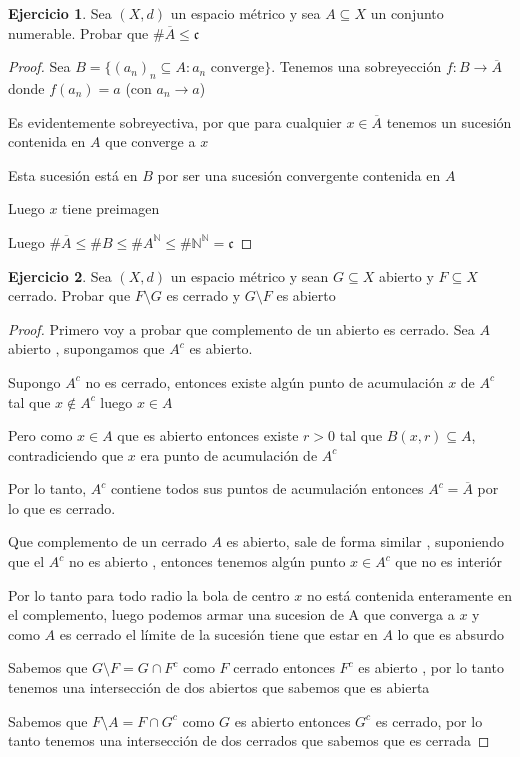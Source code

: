 \documentclass[11pt]{report}
\newcommand{\N}{\mathbb{N}}
\newcommand{\ra}{\rightarrow}
\newcommand{\ol}{\overline}
\theoremstyle{definition}
\newtheorem{ej}{Ejercicio}
\begin{document}
\begin{ej}
	Sea $(X,d)$ un espacio métrico y sea $A \subseteq X$ un conjunto numerable. Probar que $\# \ol A \leq \mathfrak{c}$
	\begin{proof}
		Sea $B = \{(a_n)_n \subseteq A : a_n \text{ converge} \}$. Tenemos una sobreyección $f : B \ra \ol A$ donde $f(a_n) = a$ (con $a_n \ra a$) 

		Es evidentemente sobreyectiva, por que para cualquier $x \in \ol A$ tenemos un sucesión contenida en $A$ que converge a $x$

		Esta sucesión está en $B$ por ser una sucesión convergente contenida en $A$ 

		Luego $x$ tiene preimagen

		Luego $\# \ol A \leq \# B \leq \# A^{\N} \leq \# \N^{\N} = \mathfrak{c} $
	\end{proof}
	
	
\end{ej}


\begin{ej}
  Sea $(X,d)$ un espacio métrico y sean $G \subseteq X$ abierto y $F \subseteq X$ cerrado. Probar que $F \setminus G$ es cerrado y $G \setminus F$ es abierto
  \begin{proof}

	  Primero voy a probar que complemento de un abierto es cerrado. Sea $A$ abierto , supongamos que $A^c$ es abierto. 

	  Supongo $A^c$ no es cerrado, entonces existe algún punto de acumulación $x$ de $A^c$ tal que $x \notin A^c$ luego $x \in A$

	  Pero como $x \in A$ que es abierto entonces existe $r>0$ tal que $B(x,r) \subseteq A$, contradiciendo que $x$ era punto de acumulación de $A^c$

	  Por lo tanto, $A^c$ contiene todos sus puntos de acumulación entonces $A^c = \ol A$ por lo que es cerrado.

	  Que complemento de un cerrado $A$ es abierto, sale de forma similar , suponiendo que el $A^c$ no es abierto , entonces tenemos algún punto $x \in A^c$ que no es interiór

	  Por lo tanto para todo radio la bola de centro $x$ no está contenida enteramente en el complemento, luego podemos armar una sucesion de A que converga a $x$ y como $A$ es cerrado el límite de la sucesión tiene que estar en $A$ lo que es absurdo

Sabemos que $G \setminus F = G \cap F^c$ como $F$ cerrado entonces $F^c$ es abierto , por lo tanto tenemos una intersección de dos abiertos que sabemos que es abierta

Sabemos que $F \setminus A = F \cap G^c$ como $G$ es abierto entonces $G^c$ es cerrado, por lo tanto tenemos una intersección de dos cerrados que sabemos que es cerrada

  \end{proof}
\end{ej}
\end{document}
